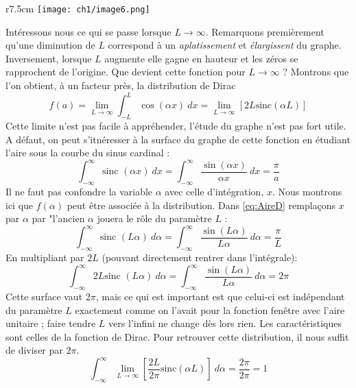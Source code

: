 \begin{wrapfigure}[8]{r}{7.5cm}
\vspace{-15mm}
\texttt{[image: ch1/image6.png]}
\end{wrapfigure}
Intéressons nous ce qui se passe lorsque $L \rightarrow \infty$. Remarquons premièrement 
qu'une diminution de $L$ correspond à un \textit{aplatissement} et \textit{élargissent} du 
graphe. Inversement, lorsque $L$ augmente elle gagne en hauteur et les zéros se rapprochent 
de l'origine. Que devient cette fonction pour $L \rightarrow\infty$ ? Montrons que l'on 
obtient, à un facteur près, la distribution de Dirac 
\begin{equation}
f(a) = \lim\limits_{L\rightarrow\infty} \int_{-L}^L \cos(\alpha x)\ dx = \lim\limits_{L 
\rightarrow \infty}[2L\text{sinc}(\alpha L)]
\end{equation}
Cette limite n'est pas facile à appréhender, l'étude du graphe n'est pas fort utile. A 
défaut, on peut s'itnéresser à la surface du graphe de cette fonction en étudiant l'aire 
sous la courbe du sinus cardinal :
\begin{equation}
\int_{-\infty}^\infty \text{sinc }(\alpha x)\ dx = \int_{-\infty}^\infty \dfrac{\sin(\alpha
x)}{\alpha x}\ dx = \dfrac{\pi}{a}
\label{eq:AireD}
\end{equation}
\danger Il ne faut pas confondre la variable $\alpha$ avec celle d'intégration, $x$. Nous 
montrons ici que $f(\alpha)$ peut être associée à la distribution. Dans \autoref{eq:AireD} 
remplaçons $x$ par $\alpha$ par "l'ancien $\alpha$ jouera le rôle du paramètre $L$ :
\begin{equation}
\int_{-\infty}^\infty \text{sinc }(L\alpha)\ d\alpha = \int_{-\infty}^\infty \dfrac{\sin(L\alpha)
}{L\alpha}\ d\alpha = \dfrac{\pi}{L}
\end{equation}
En multipliant par $2L$ (pouvant directement rentrer dans l'intégrale):
\begin{equation}
\int_{-\infty}^\infty2L \text{sinc }(L\alpha)\ d\alpha = \int_{-\infty}^\infty \dfrac{\sin(L\alpha)
}{L \alpha}\ d\alpha = 2\pi
\end{equation}
Cette surface vaut $2\pi$, mais ce qui est important est que celui-ci est indépendant 
du paramètre $L$ exactement comme on l'avait pour la fonction fenêtre avec l'aire unitaire ; 
faire tendre $L$ vers l'infini ne change dès lors rien. Les caractéristiques sont celles de 
la fonction de Dirac. Pour retrouver cette distribution, il nous suffit de diviser par $2\pi$.
\begin{equation}
\int_{-\infty}^\infty \lim\limits_{L\rightarrow\infty}[\frac{2L}{2\pi}\text{sinc}(\alpha L)]\ 
d\alpha = \frac{2\pi}{2\pi}=1
\end{equation}
